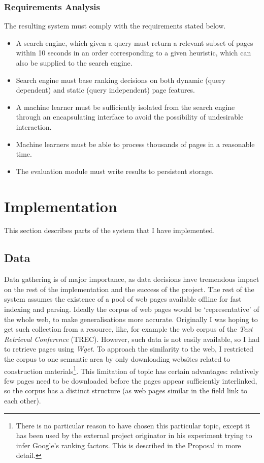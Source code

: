 \documentclass[11pt,twoside,notitlepage]{report}
\begin{document}
\subsection*{Requirements Analysis}
The resulting system must comply with the requirements stated below. 
\begin{itemize}
  \item{A search engine, which given a query must return a relevant subset of
      pages within 10 seconds in an order corresponding to a given heuristic, which can also be
  supplied to the search engine.}
  \item{Search engine must base ranking decisions on both dynamic
      (query dependent) and static (query independent)
    page features.}
  \item{A machine learner must be sufficiently isolated from the search engine
    through an encapsulating interface to avoid the possibility of undesirable interaction.}
  \item{Machine learners must be able to process thousands of pages in a
    reasonable time.}
  \item{The evaluation module must write results to persistent storage.}
\end{itemize}
\cleardoublepage
\chapter{Implementation}
This section describes parts of the system that I have implemented.

\section{Data}
Data gathering is of major importance, as data decisions have tremendous impact
on the rest of the implementation and the success of the project. The rest of
the system assumes the existence of a pool of web pages available offline for
fast indexing and parsing. Ideally the corpus of web pages would be
`representative' of the whole web, to make generalisations more accurate.
Originally I was hoping to get such collection from a resource, like, for
example the web corpus of the \textit{Text Retrieval Conference} (TREC). However,
such data is not easily available, so I had to retrieve pages using
\textit{Wget}. To approach the similarity to the web, I restricted the corpus
to one semantic area by only downloading websites related to construction
materials\footnote{There is no particular reason to have chosen this particular
topic, except it has been used by the external project originator in his
experiment trying to infer Google's ranking factors. This is described in the
Proposal in more detail.}. This limitation of topic has certain advantages:
relatively few pages need to be  downloaded before the pages appear
sufficiently interlinked, so the corpus has a distinct structure (as web pages
similar in the field link to each other).
\end{document}
